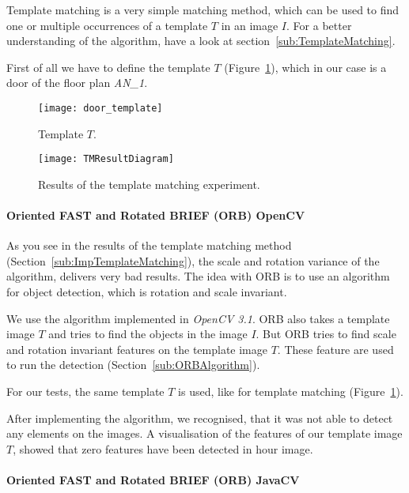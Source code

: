 Template matching is a very simple matching method, which can be used to find one or multiple occurrences of a template $T$ in an image $I$. For a better understanding of the algorithm, have a look at section~\ref{sub:TemplateMatching}.

First of all we have to define the template $T$ (Figure~\ref{fig:DoorTemplate}), which in our case is a door of the floor plan \textit{AN\_1}.

\begin{figure}[H]
	\centering
	\texttt{[image: door\_template]}
	\caption{Template $T$.}
	\label{fig:DoorTemplate}
\end{figure}


\begin{figure}[H]
	\centering
	\texttt{[image: TMResultDiagram]}
	\caption{Results of the template matching experiment.}
	\label{fig:TMResultDiagram}
\end{figure}


\paragraph{Oriented FAST and Rotated BRIEF (ORB) OpenCV}
\label{sub:ImpORB}

As you see in the results of the template matching method (Section~\ref{sub:ImpTemplateMatching}), the scale and rotation variance of the algorithm, delivers very bad results. The idea with ORB is to use an algorithm for object detection, which is rotation and scale invariant.

We use the algorithm implemented in \textit{OpenCV 3.1}. ORB also takes a template image $T$ and tries to find the objects in the image $I$. But ORB tries to find scale and rotation invariant features on the template image $T$. These feature are used to run the detection (Section~\ref{sub:ORBAlgorithm}). 

For our tests, the same template $T$ is used, like for template matching (Figure~\ref{fig:DoorTemplate}).

After implementing the algorithm, we recognised, that it was not able to detect any elements on the images. A visualisation of the features of our template image $T$, showed that zero features have been detected in hour image.

\paragraph{Oriented FAST and Rotated BRIEF (ORB) JavaCV}
\label{sub:ImpORBJVCV}


